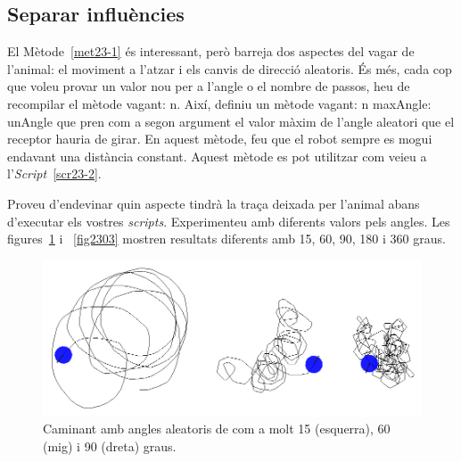 \subsection{Separar influències}
El Mètode~\ref{met23-1} és interessant, però barreja dos aspectes del vagar de l'animal: el moviment a l'atzar i els canvis de direcció aleatoris. És més, cada cop que voleu provar un valor nou per a l'angle o el nombre de passos, heu de recompilar el mètode \textsf{vagant: n}. Així, definiu un mètode \textsf{vagant: n maxAngle: unAngle} que pren com a segon argument el valor màxim de l'angle aleatori que el receptor hauria de girar. En aquest mètode, feu que el robot sempre es mogui endavant una distància constant. Aquest mètode es pot utilitzar com veieu a l'\emph{Script}~\ref{scr23-2}.


Proveu d'endevinar quin aspecte tindrà la traça deixada per l'animal abans d'executar els vostres \emph{scripts}. Experimenteu amb diferents valors pels angles. Les figures~\ref{fig2302} i ~\ref{fig2303} mostren resultats diferents amb 15, 60, 90, 180 i 360 graus. 

\begin{figure}[h!]
\begin{center}
\includegraphics[scale=0.4]{Imatges/figura23-2}
\end{center}
\caption{Caminant amb angles aleatoris de com a molt 15 (esquerra), 60 (mig) i 90 (dreta) graus.}
\label{fig2302}
\end{figure}

